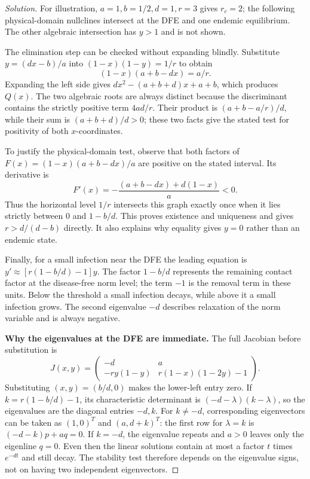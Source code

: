 \documentclass[10pt]{amsart}
\newenvironment{solution}
{\begin{proof}[Solution]}
{\end{proof}}
\begin{document}
\begin{enumerate}[label=\arabic*), leftmargin=*, itemsep=1em]
\begin{solution}
For illustration, $a=1,b=1/2,d=1,r=3$ gives $r_c=2$; the following physical-domain nullclines intersect at the DFE and one endemic equilibrium. The other algebraic intersection has $y>1$ and is not shown.

The elimination step can be checked without expanding blindly. Substitute $y=(dx-b)/a$ into $(1-x)(1-y)=1/r$ to obtain
\[
(1-x)(a+b-dx)=a/r.
\]
Expanding the left side gives $dx^2-(a+b+d)x+a+b$, which produces $Q(x)$. The two algebraic roots are always distinct because the discriminant contains the strictly positive term $4ad/r$. Their product is $(a+b-a/r)/d$, while their sum is $(a+b+d)/d>0$; these two facts give the stated test for positivity of both $x$-coordinates.

To justify the physical-domain test, observe that both factors of $F(x)=(1-x)(a+b-dx)/a$ are positive on the stated interval. Its derivative is
\[
F'(x)=-\frac{(a+b-dx)+d(1-x)}a<0.
\]
Thus the horizontal level $1/r$ intersects this graph exactly once when it lies strictly between $0$ and $1-b/d$. This proves existence and uniqueness and gives $r>d/(d-b)$ directly. It also explains why equality gives $y=0$ rather than an endemic state.

Finally, for a small infection near the DFE the leading equation is $y'\approx[r(1-b/d)-1]y$. The factor $1-b/d$ represents the remaining contact factor at the disease-free norm level; the term $-1$ is the removal term in these units. Below the threshold a small infection decays, while above it a small infection grows. The second eigenvalue $-d$ describes relaxation of the norm variable and is always negative.


\medskip\noindent\textbf{Why the eigenvalues at the DFE are immediate.}
The full Jacobian before substitution is
\[
J(x,y)=\begin{pmatrix}
-d&a\\-ry(1-y)&r(1-x)(1-2y)-1
\end{pmatrix}.
\]
Substituting $(x,y)=(b/d,0)$ makes the lower-left entry zero. If $k=r(1-b/d)-1$, its characteristic determinant is $(-d-\lambda)(k-\lambda)$, so the eigenvalues are the diagonal entries $-d,k$.
For $k\ne-d$, corresponding eigenvectors can be taken as $(1,0)^T$ and $(a,d+k)^T$: the first row for $\lambda=k$ is $(-d-k)p+aq=0$. If $k=-d$, the eigenvalue repeats and $a>0$ leaves only the eigenline $q=0$. Even then the linear solutions contain at most a factor $t$ times $e^{-dt}$ and still decay. The stability test therefore depends on the eigenvalue signs, not on having two independent eigenvectors.


\end{solution}
\end{enumerate}
\end{document}
